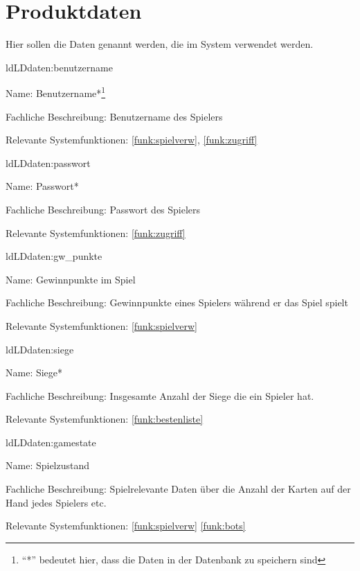 
\section{Produktdaten}\label{section:productdaten}

Hier sollen die Daten genannt werden, die im System verwendet werden.

\setcounter{ld}{10}

\begin{description}[leftmargin=5em, style=sameline]
	
	\begin{lhp}{ld}{LD}{daten:benutzername}
		\item [Name:] Benutzername*\footnote{``*'' bedeutet hier, dass die Daten in der Datenbank zu speichern sind}
		\item [Fachliche Beschreibung:] Benutzername des Spielers
		\item [Relevante Systemfunktionen:] \ref{funk:spielverw}, \ref{funk:zugriff}
	\end{lhp}
	
	\begin{lhp}{ld}{LD}{daten:passwort}
		\item [Name:] Passwort*
		\item [Fachliche Beschreibung:] Passwort des Spielers
		\item [Relevante Systemfunktionen:] \ref{funk:zugriff}
	\end{lhp}
    
	\begin{lhp}{ld}{LD}{daten:gw_punkte}
		\item [Name:] Gewinnpunkte im Spiel
		\item [Fachliche Beschreibung:] Gewinnpunkte eines Spielers während er das Spiel spielt
		\item [Relevante Systemfunktionen:] \ref{funk:spielverw}
	\end{lhp}

	\begin{lhp}{ld}{LD}{daten:siege}
		\item [Name:] Siege*
		\item [Fachliche Beschreibung:] Insgesamte Anzahl der Siege die ein Spieler hat.
		\item [Relevante Systemfunktionen:] \ref{funk:bestenliste}
	\end{lhp}

	\begin{lhp}{ld}{LD}{daten:gamestate}
		\item [Name:] Spielzustand
		\item [Fachliche Beschreibung:] Spielrelevante Daten über die Anzahl der Karten auf der Hand jedes Spielers etc.
		\item [Relevante Systemfunktionen:] \ref{funk:spielverw} \ref{funk:bots}
	\end{lhp}


\end{description}
